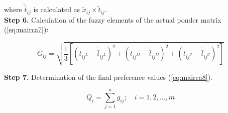 \noindent where $\tilde{\bar{t}}_{ij}$ is calculated as $\tilde{x}_{i j} \times \tilde{t}_{i j}$. \\

\noindent \textbf{Step 6.} Calculation of the fuzzy elements of the actual ponder matrix (\ref{eq:mairca7}):

\begin{equation}
G_{i j}=\sqrt{\frac{1}{3}\left[\left(\tilde{t}_{i j^L}-\tilde{\bar{t}}_{i j^L}\right)^2+\left(\tilde{t}_{i j^M}-\tilde{\bar{t}}_{i j^M}\right)^2+\left(\tilde{t}_{i j^U}-\tilde{\bar{t}}_{i j^U}\right)^2\right]}
\label{eq:mairca7}
\end{equation}

\noindent \textbf{Step 7.} Determination of the final preference values (\ref{eq:mairca8}).

\begin{equation}
Q_i=\sum_{j=1}^n g_{i j}; \quad  i=1,2, \ldots, m
\label{eq:mairca8}
\end{equation}